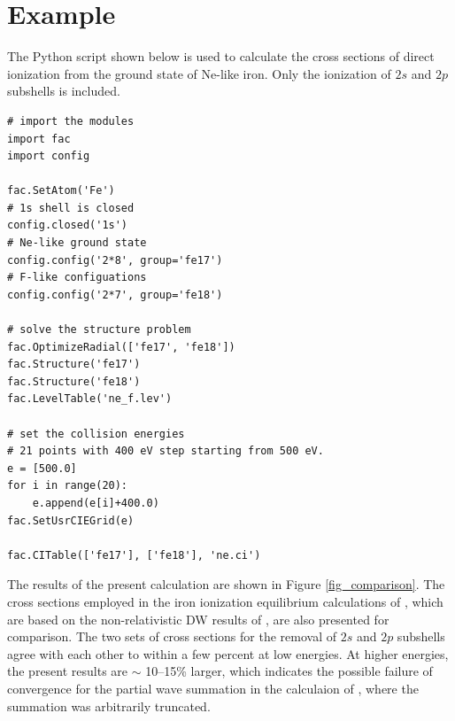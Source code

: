 \documentclass{elsart}
\begin{document}
\section{Example}
\label{sec_example}
The Python script shown below is used to calculate the cross sections of
direct ionization from the ground state of Ne-like iron. Only the ionization
of $2s$ and $2p$ subshells is included.
\begin{verbatim}
# import the modules
import fac
import config

fac.SetAtom('Fe')
# 1s shell is closed
config.closed('1s')
# Ne-like ground state
config.config('2*8', group='fe17')
# F-like configuations
config.config('2*7', group='fe18')

# solve the structure problem
fac.OptimizeRadial(['fe17', 'fe18'])
fac.Structure('fe17')
fac.Structure('fe18')
fac.LevelTable('ne_f.lev')

# set the collision energies
# 21 points with 400 eV step starting from 500 eV.
e = [500.0]
for i in range(20):
    e.append(e[i]+400.0)
fac.SetUsrCIEGrid(e)

fac.CITable(['fe17'], ['fe18'], 'ne.ci')
\end{verbatim}

The results of the present calculation are shown in Figure
\ref{fig_comparison}. The cross sections employed in the
iron ionization equilibrium calculations of \citet{arnaud92}, which are
based on the non-relativistic DW results of \citet{younger82}, are also
presented for comparison. The two sets of cross sections for the removal of
$2s$ and $2p$ subshells agree with each other to within a few percent at low
energies. At higher energies, the present results are $\sim$ 10--15\% larger,
which indicates the possible failure of convergence for the partial wave
summation in the calculaion of \citet{younger82}, where the summation was
arbitrarily truncated. 
\end{document}
